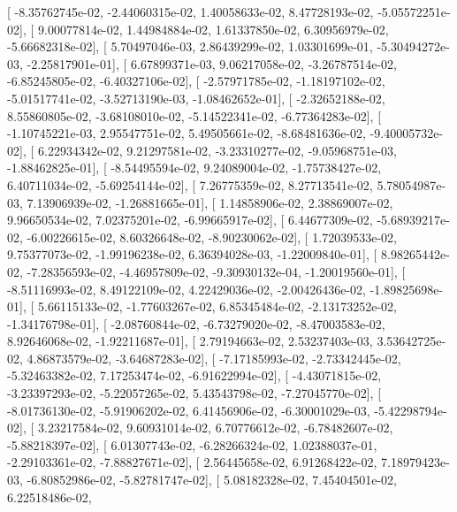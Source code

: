 \documentclass{article}
\begin{document}
       [ -8.35762745e-02,  -2.44060315e-02,   1.40058633e-02,
          8.47728193e-02,  -5.05572251e-02],
       [  9.00077814e-02,   1.44984884e-02,   1.61337850e-02,
          6.30956979e-02,  -5.66682318e-02],
       [  5.70497046e-03,   2.86439299e-02,   1.03301699e-01,
         -5.30494272e-03,  -2.25817901e-01],
       [  6.67899371e-03,   9.06217058e-02,  -3.26787514e-02,
         -6.85245805e-02,  -6.40327106e-02],
       [ -2.57971785e-02,  -1.18197102e-02,  -5.01517741e-02,
         -3.52713190e-03,  -1.08462652e-01],
       [ -2.32652188e-02,   8.55860805e-02,  -3.68108010e-02,
         -5.14522341e-02,  -6.77364283e-02],
       [ -1.10745221e-03,   2.95547751e-02,   5.49505661e-02,
         -8.68481636e-02,  -9.40005732e-02],
       [  6.22934342e-02,   9.21297581e-02,  -3.23310277e-02,
         -9.05968751e-03,  -1.88462825e-01],
       [ -8.54495594e-02,   9.24089004e-02,  -1.75738427e-02,
          6.40711034e-02,  -5.69254144e-02],
       [  7.26775359e-02,   8.27713541e-02,   5.78054987e-03,
          7.13906939e-02,  -1.26881665e-01],
       [  1.14858906e-02,   2.38869007e-02,   9.96650534e-02,
          7.02375201e-02,  -6.99665917e-02],
       [  6.44677309e-02,  -5.68939217e-02,  -6.00226615e-02,
          8.60326648e-02,  -8.90230062e-02],
       [  1.72039533e-02,   9.75377073e-02,  -1.99196238e-02,
          6.36394028e-03,  -1.22009840e-01],
       [  8.98265442e-02,  -7.28356593e-02,  -4.46957809e-02,
         -9.30930132e-04,  -1.20019560e-01],
       [ -8.51116993e-02,   8.49122109e-02,   4.22429036e-02,
         -2.00426436e-02,  -1.89825698e-01],
       [  5.66115133e-02,  -1.77603267e-02,   6.85345484e-02,
         -2.13173252e-02,  -1.34176798e-01],
       [ -2.08760844e-02,  -6.73279020e-02,  -8.47003583e-02,
          8.92646068e-02,  -1.92211687e-01],
       [  2.79194663e-02,   2.53237403e-03,   3.53642725e-02,
          4.86873579e-02,  -3.64687283e-02],
       [ -7.17185993e-02,  -2.73342445e-02,  -5.32463382e-02,
          7.17253474e-02,  -6.91622994e-02],
       [ -4.43071815e-02,  -3.23397293e-02,  -5.22057265e-02,
          5.43543798e-02,  -7.27045770e-02],
       [ -8.01736130e-02,  -5.91906202e-02,   6.41456906e-02,
         -6.30001029e-03,  -5.42298794e-02],
       [  3.23217584e-02,   9.60931014e-02,   6.70776612e-02,
         -6.78482607e-02,  -5.88218397e-02],
       [  6.01307743e-02,  -6.28266324e-02,   1.02388037e-01,
         -2.29103361e-02,  -7.88827671e-02],
       [  2.56445658e-02,   6.91268422e-02,   7.18979423e-03,
         -6.80852986e-02,  -5.82781747e-02],
       [  5.08182328e-02,   7.45404501e-02,   6.22518486e-02,
\end{document}
